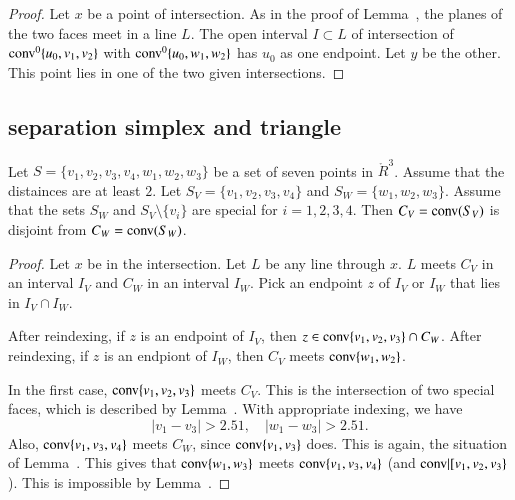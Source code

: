 \begin{proof}
Let $x$ be a point of intersection.  As in the proof of 
Lemma~, the planes of the two faces
meet in a line $L$.  The open interval $I\subset L$ of intersection of
${\operatorname{conv}}^0\{u_0,v_1,v_2\}$ with ${\operatorname{conv}}^0\{u_0,w_1,w_2\}$ has
$u_0$ as one endpoint.  Let $y$ be the other.  This point lies
in one of the two given intersections.
\end{proof}

\newpage
\subsection{separation simplex and triangle}

\begin{lemma}
Let $S=\{v_1,v_2,v_3,v_4,w_1,w_2,w_3\}$ be a set of seven points
in $\ring{R}^3$.  Assume that the distainces are at least $2$.
Let $S_V = \{v_1,v_2,v_3,v_4\}$ and $S_W=\{w_1,w_2,w_3\}$.  Assume
that the sets $S_W$ and $S_V\setminus\{v_i\}$ are special for
$i=1,2,3,4$.
Then $C_V={\operatorname{conv}}(S_V)$ is disjoint from $C_W={\operatorname{conv}}(S_W)$.
\end{lemma}

\begin{proof}  Let $x$ be in the intersection.
Let $L$ be any line through $x$.  $L$ meets $C_V$ in an interval
$I_V$ and $C_W$ in an interval $I_W$.  Pick an endpoint $z$
of $I_V$ or $I_W$ that lies in $I_V\cap I_W$.  

After reindexing, if $z$ is an endpoint of $I_V$, then
$z\in{\operatorname{conv}}\{v_1,v_2,v_3\}\cap C_W$.  After reindexing, if $z$
is an endpiont of $I_W$, then $C_V$ meets ${\operatorname{conv}}\{w_1,w_2\}$.

In the first case, ${\operatorname{conv}}\{v_1,v_2,v_3\}$ meets $C_V$.
This is the intersection of two special faces, which is described
by Lemma~.  With appropriate indexing, we have
$$
  |v_1-v_3|>2.51,\quad |w_1-w_3|>2.51.
$$
Also, ${\operatorname{conv}}\{v_1,v_3,v_4\}$ meets $C_W$, since ${\operatorname{conv}}\{v_1,v_3\}$
does.  This is again, the situation of Lemma~.
This gives that ${\operatorname{conv}}\{w_1,w_3\}$ meets ${\operatorname{conv}}\{v_1,v_3,v_4\}$
(and ${\operatorname{conv}}|[v_1,v_2,v_3\}$).  This is impossible by 
Lemma~.
\end{proof}

\newpage

